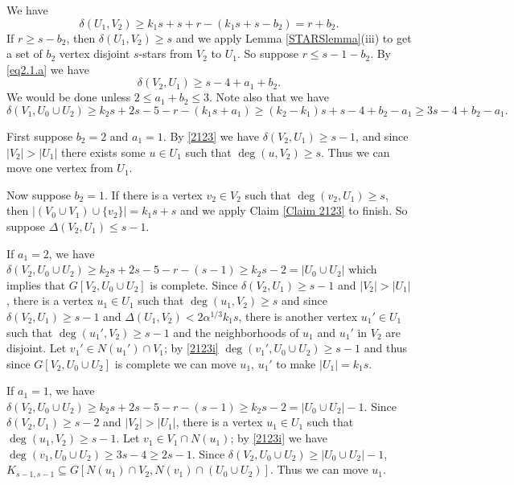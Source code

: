 \documentclass[oneside,12pt]{memoir}
\begin{document}
We have 
\begin{equation}
\delta(U_1, V_2)\geq k_1s+s+r-(k_1s+s-b_2)=r+b_2.
\end{equation}
If $r\geq s-b_2$, then $\delta(U_1, V_2)\geq s$ and we apply Lemma \ref{STARSlemma}(iii) to get a set of $b_2$ vertex disjoint $s$-stars from $V_2$ to $U_1$.  So suppose $r\leq s-1-b_2$.  By \eqref{eq2.1.a} we have 
\begin{equation}
\delta(V_2, U_1)\geq s-4+a_1+b_2.\label{2123}  
\end{equation}
We would be done unless $2\leq a_1+b_2\leq 3$. Note also that we have 
\begin{equation}
\delta(V_1, U_0\cup U_2)\geq k_2s+2s-5-r-(k_1s+a_1)\geq (k_2-k_1)s+s-4+b_2-a_1\geq 3s-4+b_2-a_1.\label{2123i}
\end{equation}

First suppose $b_2=2$ and $a_1=1$.  By \eqref{2123} we have $\delta(V_2, U_1)\geq s-1$, and since $|V_2|>|U_1|$ there exists some $u\in U_1$ such that $\deg(u, V_2)\geq s$.  Thus we can move one vertex from $U_1$.

Now suppose $b_2=1$.  If there is a vertex $v_2\in V_2$ such that $\deg(v_2, U_1)\geq s$, then $|(V_0\cup V_1)\cup\{v_2\}|=k_1s+s$ and we apply Claim \ref{Claim 2123} to finish.  So suppose $\Delta(V_2, U_1)\leq s-1$.  

If $a_1=2$, we have $\delta(V_2, U_0\cup U_2)\geq k_2s+2s-5-r-(s-1)\geq k_2s-2=|U_0\cup U_2|$ which implies that $G[V_2, U_0\cup U_2]$ is complete.  Since $\delta(V_2, U_1)\geq s-1$ and $|V_2|>|U_1|$, there is a vertex $u_1\in U_1$ such that $\deg(u_1, V_2)\geq s$ and since $\delta(V_2, U_1)\geq s-1$ and $\Delta(U_1, V_2)<2\alpha^{1/3}k_1s$, there is another vertex $u_1'\in U_1$ such that $\deg(u_1', V_2)\geq s-1$ and the neighborhoods of $u_1$ and $u_1'$ in $V_2$ are disjoint.  Let $v_1'\in N(u_1')\cap V_1$; by \eqref{2123i} $\deg(v_1', U_0\cup U_2)\geq s-1$ and thus since $G[V_2, U_0\cup U_2]$ is complete we can move $u_1$, $u_1'$ to make $|U_1|=k_1s$.

If $a_1=1$, we have $\delta(V_2, U_0\cup U_2)\geq k_2s+2s-5-r-(s-1)\geq k_2s-2=|U_0\cup U_2|-1$.  Since $\delta(V_2, U_1)\geq s-2$ and $|V_2|>|U_1|$, there is a vertex $u_1\in U_1$ such that $\deg(u_1, V_2)\geq s-1$.  Let $v_1\in V_1\cap N(u_1)$; by \eqref{2123i} we have $\deg(v_1, U_0\cup U_2)\geq 3s-4\geq 2s-1$.  Since $\delta(V_2, U_0\cup U_2)\geq |U_0\cup U_2|-1$, $K_{s-1,s-1}\subseteq G[N(u_1)\cap V_2, N(v_1)\cap (U_0\cup U_2)]$.  Thus we can move $u_1$.
\end{document}
